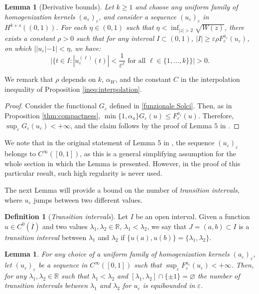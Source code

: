 \documentclass{article}
\newtheorem{Lemma}[Theorem]{Lemma}
\theoremstyle{definition}
\newtheorem{Definition}[Theorem]{Definition}
\newcommand{\R}{\mathbb{R}}
\newcommand{\e}{\varepsilon}
\let\l\ell
\def\e{\varepsilon}
\begin{document}
\begin{Lemma}[Derivative bounds]
\label{lemma:derivative_bounds}
   Let $k\geq 1$ and choose any uniform family of homogenization kernels $(a_\e)_\e$, and consider a sequence $(u_\e)_{\e}$ in $ H^{k+s}((0,1))$. 
   For each  $\eta\in(0,1)$ such that $\eta < \inf_{|z|>2}\sqrt{W(z)}$, there exists a constant $\rho > 0$ such that for any interval $I\subset (0,1)$, $|I| \geq \e \rho F^{a_{\scriptstyle\e}}_{\e}(u_\e)$,
   on which $||u_\e | -1|< \eta$, we have:
 \[
 \Big|\Big\{t \in I : |u^{(\l)}_\e(t)| < \frac{1}{\e^\l} 
\text{ for all } \l \in \{1,...,k\}\Big\}\Big|>0.
\]
\end{Lemma}
We remark that $\rho$ depends on $k$, $\alpha_W$, and the constant $C$ in the interpolation inequality of Proposition \ref{ineq:interpolation}.
\begin{proof}
    Consider the functional $G_\e$ defined in \eqref{funzionale Solci}. Then, as in Proposition \ref{thm:compactness}, $\min\{1,\alpha_a\}G_\e(u)\leq F^{a_{\scriptstyle \e}}_{\e}(u)$. Therefore, $\sup_\e G_\e(u_\e)<+\infty$, and the claim follows by the proof of Lemma $5$ in \cite{Solci_2024}.
\end{proof}
We note that in the original statement of Lemma 5 in \cite{Solci_2024}, the sequence $(u_\e)_{\e}$ belongs to $C^\infty([0,1])$, as this is a general simplifying assumption for the whole section in which the Lemma is presented. However, in the proof of this particular result, such high regularity is never used.

The next Lemma will provide a bound on the number of \emph{transition intervals}, where $u_{\e}$ jumps between two different values.
\begin{Definition}[\emph{Transition intervals}]\label{def:transition_intervals}
    Let $I$ be an open interval. Given a function $u\in C^0(\overline{I})$ and two values $\lambda_1,\lambda_2\in\R$, $\lambda_1<\lambda_2$, we say that $J=(a,b)\subset I$ is a \emph{transition interval} between $\lambda_1$ and $\lambda_2$ if $\{u(a),u(b)\} = \{\lambda_1,\lambda_2\}$.
\end{Definition}

\begin{Lemma}
    \label{lemma:transitions_number}
For any choice of a uniform family of homogenization kernels $(a_\e)_\e$, let
 $(u_\e)_{\e }$ be a sequence in   $C^\infty([0,1])$ such that $\sup_\e F^{a_{\scriptstyle\e}}_{\e}(u_\e)< +\infty$. 
 Then, for any $\lambda_1, \lambda_2\in\R$ such that $\lambda_1<\lambda_2$ and $[\lambda_1,\lambda_2]\cap \{\pm 1\} =\varnothing$ the number of transition intervals between $\lambda_1$ and $\lambda_2$ for $u_\e$ is equibounded in $\e$.
\end{Lemma}
\end{document}
